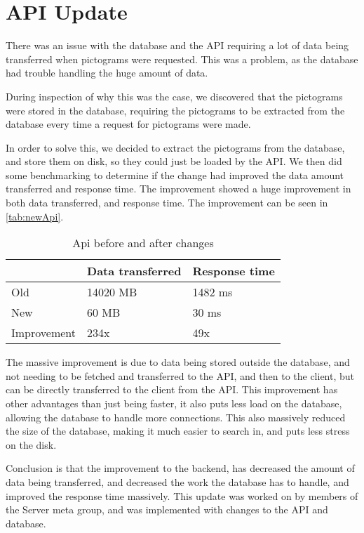 \section{API Update}\label{CollabAPIUpdate}
There was an issue with the database and the API requiring a lot of data being transferred when pictograms were requested. 
This was a problem, as the database had trouble handling the huge amount of data. 

During inspection of why this was the case, we discovered that the pictograms were stored in the database, requiring the pictograms to be extracted from the database every time a request for pictograms were made. 

In order to solve this, we decided to extract the pictograms from the database, and store them on disk, so they could just be loaded by the API. 
We then did some benchmarking to determine if the change had improved the data amount transferred and response time. 
The improvement showed a huge improvement in both data transferred, and response time. 
The improvement can be seen in \autoref{tab:newApi}.

\begin{table}[H]
    \centering
    \begin{tabular}{|l|l|l|}
    \hline
                    & Data transferred  & Response time \\ \hline
        Old         & 14020 MB          & 1482 ms       \\ \hline 
        New         & 60 MB             & 30 ms         \\ \hline
        Improvement & 234x              & 49x           \\ \hline
    \end{tabular}
    \caption{Api before and after changes}
    \label{tab:newApi}
\end{table}

The massive improvement is due to data being stored outside the database, and not needing to be fetched and transferred to the API, and then to the client, but can be directly transferred to the client from the API. 
This improvement has other advantages than just being faster, it also puts less load on the database, allowing the database to handle more connections. 
This also massively reduced the size of the database, making it much easier to search in, and puts less stress on the disk.

Conclusion is that the improvement to the backend, has decreased the amount of data being transferred, and decreased the work the database has to handle, and improved the response time massively. 
This update was worked on by members of the Server meta group, and was implemented with changes to the API and database. 
